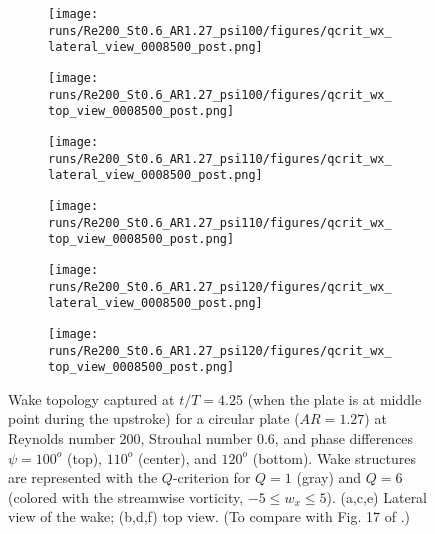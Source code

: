 \begin{figure}
  \centering
  \begin{subfigure}[]{0.45\textwidth}
    \centering
    \texttt{[image: runs/Re200\_St0.6\_AR1.27\_psi100/figures/qcrit\_wx\_lateral\_view\_0008500\_post.png]}
    \caption{}
    \label{fig:phase_wake_topology:100_lateral}
  \end{subfigure}
  \hfill
  \begin{subfigure}[]{0.45\textwidth}
    \centering
    \texttt{[image: runs/Re200\_St0.6\_AR1.27\_psi100/figures/qcrit\_wx\_top\_view\_0008500\_post.png]}
    \caption{}
    \label{fig:phase_wake_topology:100_top}
  \end{subfigure}
  \vspace{1cm}
  \begin{subfigure}[]{0.45\textwidth}
    \centering
    \texttt{[image: runs/Re200\_St0.6\_AR1.27\_psi110/figures/qcrit\_wx\_lateral\_view\_0008500\_post.png]}
    \caption{}
    \label{fig:phase_wake_topology:110_lateral}
  \end{subfigure}
  \hfill
  \begin{subfigure}[]{0.45\textwidth}
    \centering
    \texttt{[image: runs/Re200\_St0.6\_AR1.27\_psi110/figures/qcrit\_wx\_top\_view\_0008500\_post.png]}
    \caption{}
    \label{fig:phase_wake_topology:110_top}
  \end{subfigure}
  \vspace{1cm}
  \begin{subfigure}[]{0.45\textwidth}
    \centering
    \texttt{[image: runs/Re200\_St0.6\_AR1.27\_psi120/figures/qcrit\_wx\_lateral\_view\_0008500\_post.png]}
    \caption{}
    \label{fig:phase_wake_topology:120_lateral}
  \end{subfigure}
  \hfill
  \begin{subfigure}[]{0.45\textwidth}
    \centering
    \texttt{[image: runs/Re200\_St0.6\_AR1.27\_psi120/figures/qcrit\_wx\_top\_view\_0008500\_post.png]}
    \caption{}
    \label{fig:phase_wake_topology:120_top}
  \end{subfigure}
  \caption{Wake topology captured at $t / T = 4.25$ (when the plate is at middle point during the upstroke) for a circular plate ($AR = 1.27$) at Reynolds number $200$, Strouhal number $0.6$, and phase differences $\psi = 100^o$ (top), $110^o$ (center), and $120^o$ (bottom). Wake structures are represented with the $Q$-criterion for $Q = 1$ (gray) and $Q = 6$ (colored with the streamwise vorticity, $-5 \leq w_x \leq 5$). (a,c,e) Lateral view of the wake; (b,d,f) top view. (To compare with Fig. 17 of \citet{li_dong_2016}.)}
  \label{fig:phase_wake_topology}
\end{figure}

